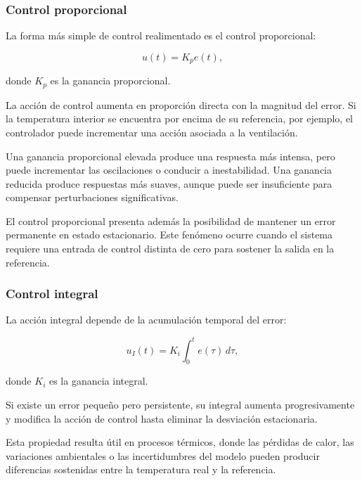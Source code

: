 \subsubsection{Control proporcional}

La forma más simple de control realimentado es el control proporcional:

\begin{equation}
u(t)
=
K_p e(t),
\label{eq:control_p}
\end{equation}

donde $K_p$ es la ganancia proporcional.

La acción de control aumenta en proporción directa con la magnitud del error. Si la temperatura interior se encuentra por encima de su referencia, por ejemplo, el controlador puede incrementar una acción asociada a la ventilación.

Una ganancia proporcional elevada produce una respuesta más intensa, pero puede incrementar las oscilaciones o conducir a inestabilidad. Una ganancia reducida produce respuestas más suaves, aunque puede ser insuficiente para compensar perturbaciones significativas.

El control proporcional presenta además la posibilidad de mantener un error permanente en estado estacionario. Este fenómeno ocurre cuando el sistema requiere una entrada de control distinta de cero para sostener la salida en la referencia.

\subsubsection{Control integral}

La acción integral depende de la acumulación temporal del error:

\begin{equation}
u_I(t)
=
K_i
\int_{0}^{t}
e(\tau)\,d\tau,
\label{eq:control_i}
\end{equation}

donde $K_i$ es la ganancia integral.

Si existe un error pequeño pero persistente, su integral aumenta progresivamente y modifica la acción de control hasta eliminar la desviación estacionaria.

Esta propiedad resulta útil en procesos térmicos, donde las pérdidas de calor, las variaciones ambientales o las incertidumbres del modelo pueden producir diferencias sostenidas entre la temperatura real y la referencia.

